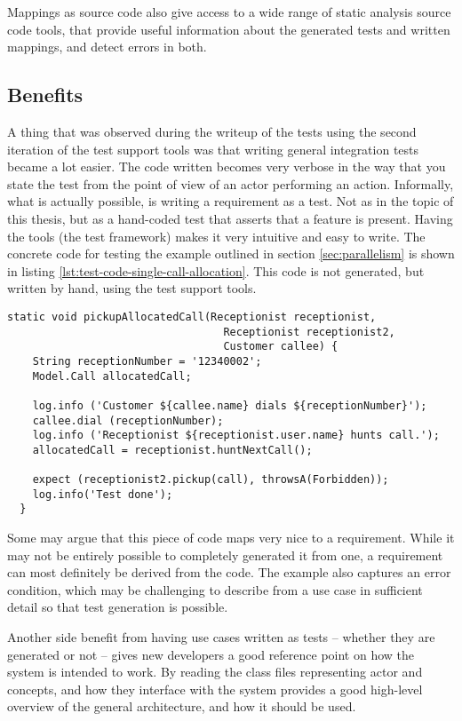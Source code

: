 \noindent Mappings as source code also give access to a wide range of static analysis source code tools, that provide useful information about the generated tests and written mappings, and detect errors in both. 

\subsection{Benefits}
A thing that was observed during the writeup of the tests using the second iteration of the test support tools was that writing general integration tests became a lot easier. The code written becomes very verbose in the way that you state the test from the point of view of an actor performing an action. Informally, what is actually possible, is writing a requirement as a test. Not as in the topic of this thesis, but as a hand-coded test that asserts that a feature is present. Having the tools (the test framework) makes it very intuitive and easy to write. The concrete code for testing the example outlined in section \ref{sec:parallelism} is shown in listing \ref{lst:test-code-single-call-allocation}. This code is not generated, but written by hand, using the test support tools.
\begin{lstlisting}[style=Dart, caption=Test code for single call allocation,label={lst:test-code-single-call-allocation}]
  static void pickupAllocatedCall(Receptionist receptionist, 
                                  Receptionist receptionist2, 
                                  Customer callee) {
    String receptionNumber = '12340002';
    Model.Call allocatedCall;
    
    log.info ('Customer ${callee.name} dials ${receptionNumber}');
    callee.dial (receptionNumber);
    log.info ('Receptionist ${receptionist.user.name} hunts call.');
    allocatedCall = receptionist.huntNextCall();
   
    expect (receptionist2.pickup(call), throwsA(Forbidden));
    log.info('Test done');
  }
\end{lstlisting}
Some may argue that this piece of code maps very nice to a requirement. While it may not be entirely possible to completely generated it from one, a requirement can most definitely be derived from the code. The example also captures an error condition, which may be challenging to describe from a use case in sufficient detail so that test generation is possible.\medskip

\noindent Another side benefit from having use cases written as tests -- whether they are generated or not -- gives new developers a good reference point on how the system is intended to work. By reading the class files representing actor and concepts, and how they interface with the system provides a good high-level overview of the general architecture, and how it should be used.

